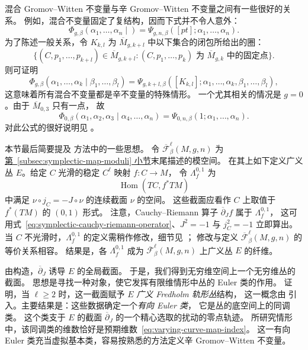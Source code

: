 混合 Gromov--Witten 不变量与辛 Gromov--Witten 不变量之间有一些很好的关系。
例如，混合不变量固定了复结构，因而下式并不令人意外：
\[
\Phi_{g,\beta}(\alpha_1,\ldots,\alpha_n\mid)
=\Psi_{g,n,\beta}([pt];\alpha_1,\ldots,\alpha_n).
\]
为了陈述一般关系，令 $K_{k,l}$ 为 $\overline M_{g,k+l}$ 中以下集合的闭包所给出的圈：
\[
\{(C,p_1,\ldots,p_{k+l})\in\overline M_{g,k+l}:
(C,p_1,\ldots,p_k)\text{ 为 }\overline M_{g,k}\text{ 中的固定点}\}.
\]
则可证明
\[
\Phi_{g,\beta}(\alpha_1,\ldots,\alpha_k\mid\beta_1,\ldots,\beta_l)
=\Psi_{g,k+l,\beta}([K_{k,l}];
\alpha_1,\ldots,\alpha_k,\beta_1,\ldots,\beta_l),
\]
这意味着所有混合不变量都是辛不变量的特殊情形。
一个尤其相关的情况是 $g=0$。由于 $\overline M_{0,3}$ 只有一点，
故
\begin{equation}\label{eq:genus-zero-mixed-symplectic}
\Phi_{0,\beta}(\alpha_1,\alpha_2,\alpha_3\mid\alpha_4,\ldots,\alpha_n)
=\Psi_{0,n,\beta}(1;\alpha_1,\ldots,\alpha_n).
\end{equation}
对此公式的很好说明见 。

本节最后简要提及  方法中的一些思想。
令 $\overline{\mathcal F}^{\ell}_\beta(M,g,n)$ 为\hyperref[subsec:symplectic-map-moduli]{第~\ref*{subsec:symplectic-map-moduli} 小节}末尾描述的模空间。
在其上如下定义广义丛 $E$。给定 $C$ 光滑的稳定 $C^\ell$ 映射 $f:C\to M$，
令 $\Lambda_f^{0,1}$ 为
\[
\operatorname{Hom}(TC,f^*TM)
\]
中满足 $\nu\circ j_C=-J\circ\nu$ 的连续截面 $\nu$ 的空间。
这些截面应看作 $C$ 上取值于 $f^*(TM)$ 的 $(0,1)$ 形式。
注意，Cauchy--Riemann 算子 $\overline\partial_Jf$ 属于 $\Lambda_f^{0,1}$，
这可用式~\eqref{eq:symplectic-cauchy-riemann-operator}、$J^2=-1$ 与 $j_C^2=-1$ 立即算出。
当 $C$ 不光滑时，$\Lambda_f^{0,1}$ 的定义需稍作修改，细节见 ；
修改与定义 $\overline{\mathcal F}^{\ell}_\beta(M,g,n)$ 的等价关系相容。
结果是，各 $\Lambda_f^{0,1}$ 成为 $\overline{\mathcal F}^{\ell}_\beta(M,g,n)$ 上广义丛 $E$ 的纤维。

由构造，$\overline\partial_J$ 诱导 $E$ 的全局截面。
于是，我们得到无穷维空间上一个无穷维丛的截面。
思想是寻找一种对象，使它发挥有限维情形中丛的 Euler 类的作用。
 证明，当 $\ell\geq2$ 时，这一截面赋予 $E$ \emph{广义 Fredholm 轨形丛}结构，
这一概念由  引入。主要结果是：这些数据确定一个\emph{有向 Euler 类}，
它是丛的底空间上的同调类。
这个类支于 $E$ 的截面 $\overline\partial_J$ 的一个精心选取的扰动的零点轨迹。
所研究情形中，该同调类的维数恰好是预期维数~\eqref{eq:varying-curve-map-index}。
这一有向 Euler 类充当虚拟基本类，容易按熟悉的方法定义辛 Gromov--Witten 不变量。

